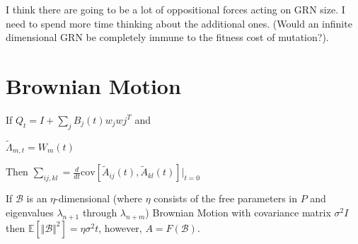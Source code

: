 \documentclass[a4paper, 11 pt]{article}
\begin{document}
              I think there are going to be a lot of oppositional forces acting on GRN size. I need to spend more time thinking about the additional ones. (Would an infinite dimensional GRN be completely immune to the fitness cost of mutation?).

  \section{Brownian Motion}

    If $Q_{t} = I + \sum_{j} B_{j}(t)w_{j}w{j}^{T}$ and

    $\tilde{\Lambda}_{m,t} = W_{m}(t)$

    Then $\sum_{ij, kl} = \frac{d}{dt} \text{cov} [\tilde{A}_{ij}(t), \tilde{A}_{kl}(t)] \vert_{t=0}$



    If $\mathcal{B}$ is an $\eta$-dimensional (where $\eta$ consists of the free parameters in $P$ and eigenvalues $\lambda_{n+1}$ through $\lambda_{n+m}$) Brownian Motion with covariance matrix $\sigma^{2} I$ then $\mathbb{E}\left[ \Vert \mathcal{B} \Vert^{2} \right] = \eta \sigma^{2} t$, however, $A = F(\mathcal{B})$. 
\end{document}

